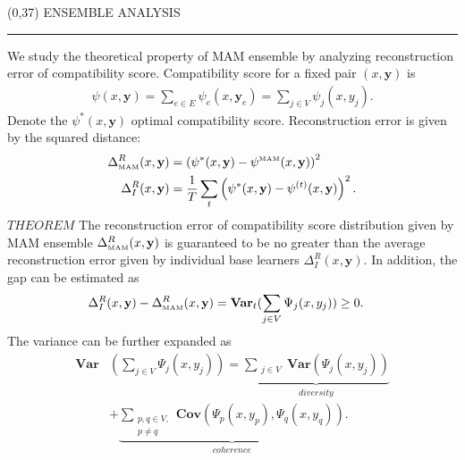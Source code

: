 \documentclass[a4poster]{article}
\newcommand{\yb}{\mathbf{y}}
\newcommand{\var}{\textbf{Var}}
\newcommand{\cov}{\textbf{Cov}}
\begin{document}
\begin{textblock}{60}(0,37)
	\sffamily
	\Large{\color{sciorange}ENSEMBLE ANALYSIS}\small\\
	\rule[3mm]{60mm}{0.1pt}
	\begin{multicols}{2}
	\end{multicols}
	\vspace{-13mm}
	\footnotesize

	We study the theoretical property of MAM ensemble by analyzing reconstruction error of compatibility score.
	Compatibility score for a fixed pair $(x,\yb)$ is 
	\begin{align*}
		\psi(x,\yb) = \sum_{e \in E} \psi_e(x,\yb_e) = \sum_{j\in V} \psi_j(x,y_j).
	\end{align*}
	Denote the $\psi^*(x,\yb)$ optimal compatibility score.
	Reconstruction error is given by the squared distance: 
	\begin{align*}
		\Delta^R_{\text{\tiny MAM}}(x,\yb) &= \left(\psi^*(x,\yb)-\psi^{\text{\tiny MAM}}(x,\yb)\right)^2 \\
		\Delta^R_I(x,\yb) &= \frac{1}{T}\sum_{t}\left(\psi^*(x,\yb)-\psi^{(t)}(x,\yb)\right)^2.
	\end{align*}
	$THEOREM$ The reconstruction error of compatibility score distribution given by MAM ensemble $\Delta^R_{\text{\tiny MAM}}(x,\yb)$ is guaranteed to be no greater than the average reconstruction error given by individual base learners $\Delta^R_I(x,\yb)$. 
	In addition, the gap can be estimated as 
	\begin{align*}
		\Delta^R_I(x,\yb) - \Delta^R_{\text{\tiny MAM}}(x,\yb) &= \var_t(\sum_{j\in V}\Psi_j(x,y_j)) \ge 0.
	\end{align*}
	The variance can be further expanded as 
	\begin{align*}
		\var&(\sum_{j\in V}\Psi_j(x,y_j))  = \underbrace{\sum_{\substack{j\in V\\\,}}\var(\Psi_j(x,y_j))}_{diversity} \\
		&+ \underbrace{\sum_{\substack{p,q\in V,\\p\ne q}}\cov(\Psi_{p}(x,y_p),\Psi_{q}(x,y_q))}_{coherence}.
	\end{align*}
	
\end{textblock}
\end{document}
